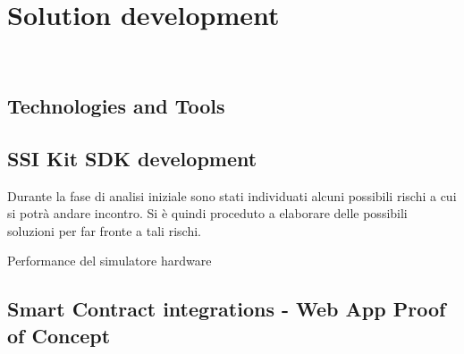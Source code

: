 
\chapter{Solution development}
\label{cap:descrizione-stage}

\\

\section{Technologies and Tools}

\section{SSI Kit SDK development}

Durante la fase di analisi iniziale sono stati individuati alcuni possibili rischi a cui si potrà andare incontro.
Si è quindi proceduto a elaborare delle possibili soluzioni per far fronte a tali rischi.\\

\begin{risk}{Performance del simulatore hardware}
    \label{risk:hardware-simulator} 
\end{risk}

\section{Smart Contract integrations - Web App Proof of Concept}

